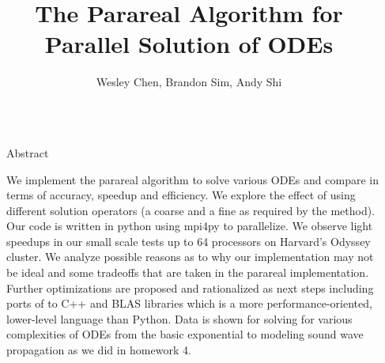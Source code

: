 \documentclass[final]{beamer}
\title{The Parareal Algorithm for Parallel Solution of ODEs} %
\author{Wesley Chen, Brandon Sim, Andy Shi} %
\institute{Harvard University, Applied Math 205 Final Project} %
\newlength{\sepwid}
\newlength{\onecolwid}
\begin{document}

\setlength{\belowcaptionskip}{2ex} %
\setlength\belowdisplayshortskip{2ex} %

\begin{frame}[t] %

\begin{columns}[t] %

\begin{column}{\sepwid}\end{column} %

\begin{column}{\onecolwid} %


\begin{alertblock}{Abstract}

We implement the parareal algorithm to solve various ODEs and compare in
terms of accuracy, speedup and efficiency. We explore the effect of using
different solution operators (a coarse and a fine as required by the method).
Our code is written in python using mpi4py to parallelize. We observe
light speedups in our small scale tests up to 64 processors on Harvard's
Odyssey cluster. We analyze possible reasons as to why our implementation
may not be ideal and some tradeoffs that are taken in the parareal
implementation. Further optimizations are proposed and rationalized as next
steps including ports of to C++ and BLAS libraries which is a more
performance-oriented, lower-level language than Python. Data is shown for
solving for various complexities of ODEs from the basic exponential to
modeling sound wave propagation as we did in homework 4.

\end{alertblock}



\end{column}
\end{columns}
\end{frame}
\end{document}
